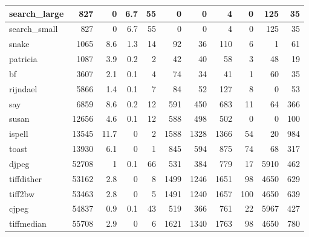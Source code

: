 \begin{tabular}{|l|r|r|r|r|r|r|r|r|r|r|}
\hline
 search\_large    &            827 &      0   &    6.7 &   55 &      0 &          0 &            4 &     0 &   125 &    35 \\
\hline
 search\_small    &            827 &      0   &    6.7 &   55 &      0 &          0 &            4 &     0 &   125 &    35 \\
\hline
 snake           &           1065 &      8.6 &    1.3 &   14 &     92 &         36 &          110 &     6 &     1 &    61 \\
\hline
 patricia        &           1087 &      3.9 &    0.2 &    2 &     42 &         40 &           58 &     3 &    48 &    19 \\
\hline
 bf              &           3607 &      2.1 &    0.1 &    4 &     74 &         34 &           41 &     1 &    60 &    35 \\
\hline
 rijndael        &           5866 &      1.4 &    0.1 &    7 &     84 &         52 &          127 &     8 &     0 &    53 \\
\hline
 say             &           6859 &      8.6 &    0.2 &   12 &    591 &        450 &          683 &    11 &    64 &   366 \\
\hline
 susan           &          12656 &      4.6 &    0.1 &   12 &    588 &        498 &          502 &     0 &     0 &   100 \\
\hline
 ispell          &          13545 &     11.7 &    0   &    2 &   1588 &       1328 &         1366 &    54 &    20 &   984 \\
\hline
 toast           &          13930 &      6.1 &    0   &    1 &    845 &        594 &          875 &    74 &    68 &   317 \\
\hline
 djpeg           &          52708 &      1   &    0.1 &   66 &    531 &        384 &          779 &    17 &  5910 &   462 \\
\hline
 tiffdither      &          53162 &      2.8 &    0   &    8 &   1499 &       1246 &         1651 &    98 &  4650 &   629 \\
\hline
 tiff2bw         &          53463 &      2.8 &    0   &    5 &   1491 &       1240 &         1657 &   100 &  4650 &   639 \\
\hline
 cjpeg           &          54837 &      0.9 &    0.1 &   43 &    519 &        366 &          761 &    22 &  5967 &   427 \\
\hline
 tiffmedian      &          55708 &      2.9 &    0   &    6 &   1621 &       1340 &         1763 &    98 &  4650 &   780 \\
\hline
\end{tabular}

